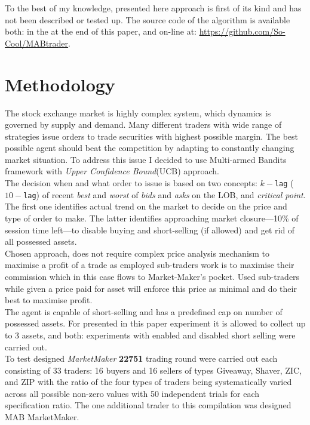 \documentclass{llncs}
\begin{document}
To the best of my knowledge, presented here approach is first of its kind and has not been described or tested up. The source code of the algorithm is available both: in the \emph{\appendixname} at the end of this paper, and on-line at: \url{https://github.com/So-Cool/MABtrader}.\\

\section{Methodology}
The stock exchange market is highly complex system, which dynamics is governed by supply and demand. Many different traders with wide range of strategies issue orders to trade securities with highest possible margin. The best possible agent should beat the competition by adapting to constantly changing market situation. To address this issue I decided to use Multi-armed Bandits framework with \emph{Upper Confidence Bound}(UCB) approach.\\

The decision when and what order to issue is based on two concepts: $k-$\texttt{lag} ($10-$\texttt{lag}) of recent \emph{best} and \emph{worst} of \emph{bids} and \emph{asks} on the LOB, and \emph{critical point}. The first one identifies actual trend on the market to decide on the price and type of order to make. The latter identifies approaching market closure---10\% of session time left---to disable buying and short-selling (if allowed) and get rid of all possessed assets.\\
Chosen approach, does not require complex price analysis mechanism to maximise a profit of a trade as employed sub-traders work is to maximise their commission which in this case flows to Market-Maker's pocket. Used sub-traders while given a price paid for asset will enforce this price as minimal and do their best to maximise profit.\\
The agent is capable of short-selling and has a predefined cap on number of possessed assets. For presented in this paper experiment it is allowed to collect up to $3$ assets, and both: experiments with enabled and disabled short selling were carried out.\\

To test designed \emph{MarketMaker} \textbf{22751} trading round were carried out each consisting of 33 traders: 16 buyers and 16 sellers of types Giveaway, Shaver, ZIC, and ZIP with the ratio of the four types of traders being systematically varied across all possible non-zero values with 50 independent trials for each specification ratio. The one additional trader to this compilation was designed MAB MarketMaker.
\end{document}
